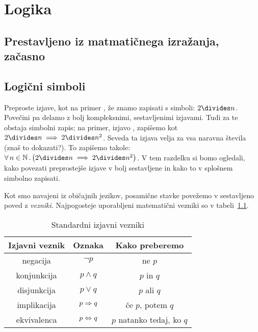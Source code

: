 \chapter{Logika}\label{poglavje:logika}

\section{Prestavljeno iz matmatičnega izražanja, začasno}
\label{sec:prest-iz-matm}


\section{Logični simboli}\label{razdelek:logicni-simboli}

Preproste izjave, kot na primer , že znamo zapisati s simboli: $2 \divides n$. Povečini pa delamo z bolj kompleksnimi, sestavljenimi izjavami. Tudi za te obstaja simbolni zapis; na primer, izjavo , zapišemo kot $2 \divides n \implies 2 \divides n^2$. Seveda ta izjava velja za vsa naravna števila (znaš to dokazati?). To zapišemo takole: $\all{n}[\NN]{2 \divides n \implies 2 \divides n^2}$. V tem razdelku si bomo ogledali, kako povezati preprostejše izjave v bolj sestavljene in kako to v splošnem simbolno zapisati.

Kot smo navajeni iz običajnih jezikov, posamične stavke povežemo v sestavljeno poved z \emph{vezniki}. Najpogosteje uporabljeni matematični vezniki so v tabeli~\ref{tabela:standardni-izjavni-vezniki}.

\begin{table}[!ht]
\centering
\begin{tabular}{|ccc|}
\hline
\textbf{Izjavni veznik} & \textbf{Oznaka} & \textbf{Kako preberemo} \\
\hline
negacija & $\lnot{p}$ & ne $p$ \\
konjunkcija & $p \land q$ & $p$ in $q$ \\
disjunkcija & $p \lor q$ & $p$ ali $q$ \\
implikacija & $p \Rightarrow q$ & če $p$, potem $q$ \\
ekvivalenca & $p \Leftrightarrow q$ & $p$ natanko tedaj, ko $q$ \\
\hline
\end{tabular}
\caption{Standardni izjavni vezniki}\label{tabela:standardni-izjavni-vezniki}
\end{table}

